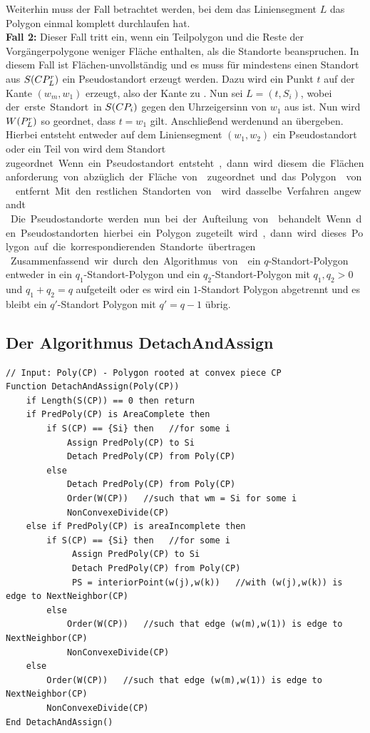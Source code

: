 \documentclass[ngerman]{seminarbeitrag}
\begin{document}
Weiterhin muss der Fall betrachtet werden, bei dem das Liniensegment $L$ das Polygon einmal komplett durchlaufen hat.\\
\textbf{Fall 2:} Dieser Fall tritt ein, wenn ein Teilpolygon und die Reste der Vorgängerpolygone weniger Fläche enthalten, als die Standorte beanspruchen. In diesem Fall ist \cpi Flächen-unvollständig und es muss für mindestens einen Standort aus $S(CP_{L}^{r})$ ein Pseudostandort erzeugt werden. Dazu wird ein Punkt $t$ auf der Kante $(w_{m}, w_{1})$ erzeugt, also der Kante zu \next{\mcpi}. Nun sei $L = (t, S_{i})$, wobei \si der erste Standort in $S(CP_{i})$ gegen den Uhrzeigersinn von $w_{1}$ aus ist. Nun wird $W(P_{L}^{r})$ so geordnet, dass $t = w_{1}$ gilt. Anschließend werden\prl und \pll an \daa übergeben. Hierbei entsteht entweder auf dem Liniensegment $(w_{1}, w_{2})$ ein Pseudostandort oder ein Teil von \prl wird dem Standort \si zugeordnet. Wenn ein Pseudostandort entsteht, dann wird diesem die Flächenanforderung von \si abzüglich der Fläche von \prl zugeordnet und das Polygon \prl von \cpi entfernt. Mit den restlichen Standorten von \cpi wird dasselbe Verfahren angewandt.\\
Die Pseudostandorte werden nun bei der Aufteilung von \next{\mcpi}behandelt. Wenn den Pseudostandorten hierbei ein Polygon zugeteilt wird, dann wird dieses Polygon auf die korrespondierenden Standorte übertragen.\\
Zusammenfassend wir durch den Algorithmus von \noncon ein $q$-Standort-Polygon entweder in ein $q_{1}$-Standort-Polygon und ein $q_{2}$-Standort-Polygon mit $q_{1}, q_{2} > 0$ und $q_{1} + q_{2} = q$ aufgeteilt oder es wird ein $1$-Standort Polygon abgetrennt und es bleibt ein $q'$-Standort Polygon mit $q' = q - 1$ übrig.

\subsection{Der Algorithmus DetachAndAssign}\label{detach}

\begin{lstlisting}[float,caption={Der Algorithmus \daa}, frame=single, label=code detach]
// Input: Poly(CP) - Polygon rooted at convex piece CP
Function DetachAndAssign(Poly(CP))
    if Length(S(CP)) == 0 then return 
    if PredPoly(CP) is AreaComplete then
        if S(CP) == {Si} then   //for some i
            Assign PredPoly(CP) to Si
            Detach PredPoly(CP) from Poly(CP)
        else
            Detach PredPoly(CP) from Poly(CP)
            Order(W(CP))   //such that wm = Si for some i
            NonConvexeDivide(CP)
    else if PredPoly(CP) is areaIncomplete then
        if S(CP) == {Si} then	//for some i
             Assign PredPoly(CP) to Si
             Detach PredPoly(CP) from Poly(CP)
             PS = interiorPoint(w(j),w(k))   //with (w(j),w(k)) is edge to NextNeighbor(CP)
        else
            Order(W(CP))   //such that edge (w(m),w(1)) is edge to NextNeighbor(CP)
            NonConvexeDivide(CP)
    else
        Order(W(CP))   //such that edge (w(m),w(1)) is edge to NextNeighbor(CP)
        NonConvexeDivide(CP)
End DetachAndAssign()

\end{lstlisting}
\end{document}
